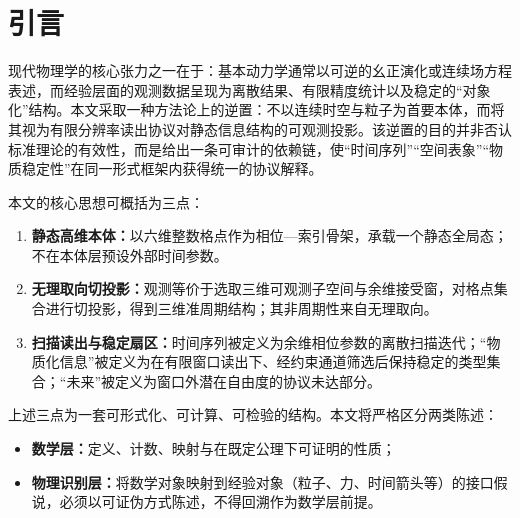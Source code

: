 \section{引言}

现代物理学的核心张力之一在于：基本动力学通常以可逆的幺正演化或连续场方程表述，而经验层面的观测数据呈现为离散结果、有限精度统计以及稳定的“对象化”结构。本文采取一种方法论上的逆置：不以连续时空与粒子为首要本体，而将其视为有限分辨率读出协议对静态信息结构的可观测投影。该逆置的目的并非否认标准理论的有效性，而是给出一条可审计的依赖链，使“时间序列”“空间表象”“物质稳定性”在同一形式框架内获得统一的协议解释。

本文的核心思想可概括为三点：
\begin{enumerate}
  \item \textbf{静态高维本体：}以六维整数格点作为相位—索引骨架，承载一个静态全局态；不在本体层预设外部时间参数。
  \item \textbf{无理取向切投影：}观测等价于选取三维可观测子空间与余维接受窗，对格点集合进行切投影，得到三维准周期结构；其非周期性来自无理取向。
  \item \textbf{扫描读出与稳定扇区：}时间序列被定义为余维相位参数的离散扫描迭代；“物质化信息”被定义为在有限窗口读出下、经约束通道筛选后保持稳定的类型集合；“未来”被定义为窗口外潜在自由度的协议未达部分。
\end{enumerate}

上述三点为一套可形式化、可计算、可检验的结构。本文将严格区分两类陈述：
\begin{itemize}
  \item \textbf{数学层：}定义、计数、映射与在既定公理下可证明的性质；
  \item \textbf{物理识别层：}将数学对象映射到经验对象（粒子、力、时间箭头等）的接口假说，必须以可证伪方式陈述，不得回溯作为数学层前提。
\end{itemize}

